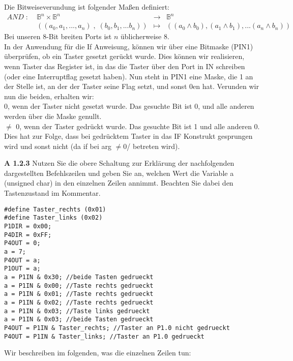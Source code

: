 \begin{description}
Die Bitweiseverundung ist folgender Maßen definiert:
$$
\begin{array}{crcl}
AND  \; : \; & \mathbb{B}^n \times \mathbb{B}^n &\rightarrow & \mathbb{B}^n\\
&  ((a_0, a_1, ... , a_n) \; , \; ( b_0, b_1, ... b_n)) & \mapsto & ((a_0 \land b_0), (a_1 \land b_1), ... (a_n \land b_n))
\end{array}
$$
Bei unseren 8-Bit breiten Ports ist $n$ üblicherweise 8.\\

In der Anwendung für die If Anweisung, können wir über eine Bitmaske (PIN1) überprüfen, ob ein Taster gesetzt gerückt wurde. Dies können wir realisieren, wenn Taster das Register ist, in das die Taster über den Port in IN schreiben (oder eine Interruptflag gesetzt haben). Nun steht in PIN1 eine Maske, die 1 an der Stelle ist, an der der Taster seine Flag setzt, und sonst 0en hat. Verunden wir nun die beiden, erhalten wir:\\
0, wenn der Taster nicht gesetzt wurde. Das gesuchte Bit ist 0, und alle anderen werden über die Maske genullt.\\
$\not=$ 0, wenn der Taster gedrückt wurde. Das gesuchte Bit ist 1 und alle anderen 0.\\

Dies hat zur Folge, dass bei gedrücktem Taster in das IF Konstrukt gesprungen wird und sonst nicht (da if bei arg $\not= 0$/ betreten wird).

\item{\bfseries A 1.2.3} Nutzen Sie die obere Schaltung zur Erklärung der nachfolgenden dargestellten Befehlszeilen und geben Sie an, welchen Wert die Variable a (unsigned char) in den einzelnen Zeilen annimmt. Beachten Sie dabei den Tastenzustand im Kommentar.

\begin{lstlisting}
#define Taster_rechts (0x01)
#define Taster_links (0x02)
P1DIR = 0x00;
P4DIR = 0xFF;
P4OUT = 0;
a = 7;
P4OUT = a;
P1OUT = a;
a = P1IN & 0x30; //beide Tasten gedrueckt
a = P1IN & 0x00; //Taste rechts gedrueckt
a = P1IN & 0x01; //Taste rechts gedrueckt
a = P1IN & 0x02; //Taste rechts gedrueckt
a = P1IN & 0x03; //Taste links gedrueckt
a = P1IN & 0x03; //beide Tasten gedrueckt
P4OUT = P1IN & Taster_rechts; //Taster an P1.0 nicht gedrueckt
P4OUT = P1IN & Taster_links; //Taster an P1.0 gedrueckt
\end{lstlisting}

Wir beschreiben im folgenden, was die einzelnen Zeilen tun:


\end{description}
